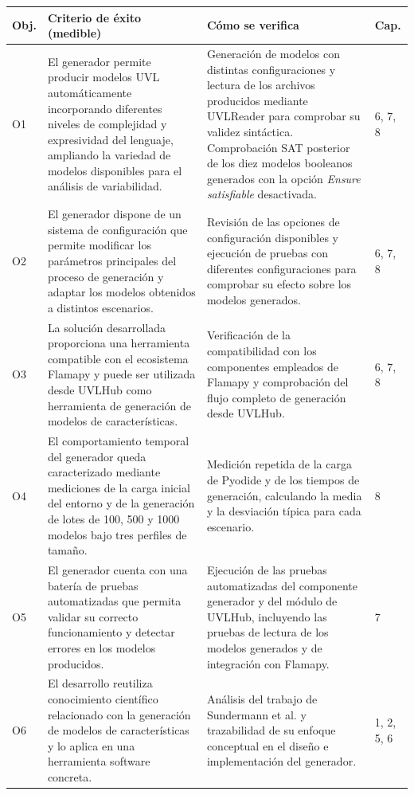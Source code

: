 \begin{longtable}{@{}P{1cm} P{6.2cm} P{4.6cm} P{1.7cm}@{}}
  \toprule
  \textbf{Obj.} & \textbf{Criterio de éxito (medible)} & \textbf{Cómo se verifica} & \textbf{Cap.} \\
  \midrule
  \endhead
  O1 & El generador permite producir modelos UVL automáticamente incorporando diferentes niveles de complejidad y expresividad del lenguaje, ampliando la variedad de modelos disponibles para el análisis de variabilidad. & Generación de modelos con distintas configuraciones y lectura de los archivos producidos mediante UVLReader para comprobar su validez sintáctica. Comprobación SAT posterior de los diez modelos booleanos generados con la opción \textit{Ensure satisfiable} desactivada. & 6, 7, 8 \\[0.3em]
  O2 & El generador dispone de un sistema de configuración que permite modificar los parámetros principales del proceso de generación y adaptar los modelos obtenidos a distintos escenarios. & Revisión de las opciones de configuración disponibles y ejecución de pruebas con diferentes configuraciones para comprobar su efecto sobre los modelos generados. & 6, 7, 8 \\[0.3em]
  O3 & La solución desarrollada proporciona una herramienta compatible con el ecosistema Flamapy y puede ser utilizada desde UVLHub como herramienta de generación de modelos de características. & Verificación de la compatibilidad con los componentes empleados de Flamapy y comprobación del flujo completo de generación desde UVLHub. & 6, 7, 8 \\[0.3em]
  O4 & El comportamiento temporal del generador queda caracterizado mediante mediciones de la carga inicial del entorno y de la generación de lotes de 100, 500 y 1000 modelos bajo tres perfiles de tamaño. & Medición repetida de la carga de Pyodide y de los tiempos de generación, calculando la media y la desviación típica para cada escenario. & 8 \\
  O5 & El generador cuenta con una batería de pruebas automatizadas que permita validar su correcto funcionamiento y detectar errores en los modelos producidos. & Ejecución de las pruebas automatizadas del componente generador y del módulo de UVLHub, incluyendo las pruebas de lectura de los modelos generados y de integración con Flamapy. & 7 \\
  
  O6 & El desarrollo reutiliza conocimiento científico relacionado con la
  generación de modelos de características y lo aplica en una herramienta
  software concreta. & Análisis del trabajo de Sundermann et al. y trazabilidad
  de su enfoque conceptual en el diseño e implementación del generador. & 1, 2,
  5, 6 \\[0.3em]


\end{longtable}
